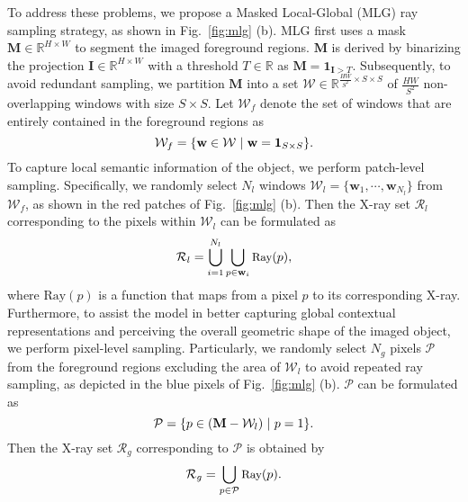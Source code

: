 \documentclass[10pt,twocolumn,letterpaper]{article}
\begin{document}
To address these problems, we propose a Masked Local-Global (MLG) ray sampling strategy, as shown in Fig.~\ref{fig:mlg} (b). MLG first uses a mask $\mathbf{M} \in \mathbb{R}^{H\times W}$ to segment the imaged foreground regions. $\mathbf{M}$ is derived by binarizing the projection $\mathbf{I} \in \mathbb{R}^{H\times W}$ with a threshold $T \in \mathbb{R}$ as $\mathbf{M} = \mathbf{1}_{\mathbf{I}>T}$. Subsequently, to avoid redundant sampling, we partition $\mathbf{M}$ into a set $\mathcal{W} \in \mathbb{R}^{\frac{HW}{S^2} \times S\times S}$ of $\frac{HW}{S^2}$ non-overlapping windows with size $S\times S$. Let $\mathcal{W}_f$ denote the set of windows that are entirely contained in the foreground regions as
\begin{equation}
\small
\mathcal{W}_f = \{\mathbf{w} \in \mathcal{W}~|~\mathbf{w} = \mathbf{1}_{S \times S}\}.
\label{eq:patch_sampling}
\end{equation}
To capture local semantic information of the object, we perform patch-level sampling. Specifically, we randomly select $N_l$ windows $\mathcal{W}_l = \{\mathbf{w}_1, \cdots, \mathbf{w}_{N_l}\}$ from $\mathcal{W}_f$, as shown in the red patches of Fig.~\ref{fig:mlg} (b). Then the X-ray set $\mathcal{R}_l$ corresponding to the pixels within $\mathcal{W}_l$ can be formulated as
\vspace{-1mm}
\begin{equation}
\small
\mathcal{R}_l = \bigcup_{i = 1}^{N_l}\bigcup_{p \in \mathbf{w}_i} \text{Ray}(p),
\vspace{-1mm}
\end{equation}
where $\text{Ray}(p)$ is a function that maps from a pixel $p$ to its corresponding X-ray. Furthermore, to assist the model in better capturing global contextual representations and perceiving the overall geometric shape of the imaged object, we perform pixel-level sampling. Particularly, we randomly select $N_g$ pixels $\mathcal{P}$ from the foreground regions excluding the area of $\mathcal{W}_l$ to avoid repeated ray sampling, as depicted in the blue pixels of Fig.~\ref{fig:mlg} (b). $\mathcal{P}$ can be formulated as
\vspace{-0.0mm}
\begin{equation}
\small
\mathcal{P} = \{p \in (\mathbf{M} - \mathcal{W}_l)~|~p = 1\}.
\vspace{-0.4mm}
\end{equation}
Then the X-ray set $\mathcal{R}_g$ corresponding to  $\mathcal{P}$ is obtained by
\vspace{-1mm}
\begin{equation}
\small
\mathcal{R}_g = \bigcup_{p \in \mathcal{P}} \text{Ray}(p).
\vspace{-1mm}
\end{equation}
\end{document}
